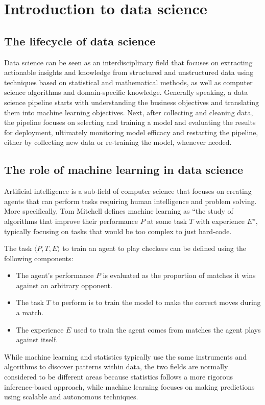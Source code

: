 \documentclass{report}
\begin{document}
\tableofcontents

\chapter{Introduction to data science}
\section{The lifecycle of data science}
Data science can be seen as an interdisciplinary field that focuses on extracting actionable insights and knowledge from structured and unstructured data using techniques based on statistical and mathematical methods, as well as computer science algorithms and domain-specific knowledge. \newline
Generally speaking, a data science pipeline starts with understanding the business objectives and translating them into machine learning objectives. \newline
Next, after collecting and cleaning data, the pipeline focuses on selecting and training a model and evaluating the results for deployment, ultimately monitoring model efficacy and restarting the pipeline, either by collecting new data or re-training the model, whenever needed.
\section{The role of machine learning in data science}
Artificial intelligence is a sub-field of computer science that focuses on creating agents that can perform tasks requiring human intelligence and problem solving. \newline
More specifically, Tom Mitchell defines machine learning as ``the study of algorithms that improve their performance $\displaystyle P$ at some task $\displaystyle T$ with experience $\displaystyle E$'', typically focusing on tasks that would be too complex to just hard-code.
\begin{examplebox}
    The task $\displaystyle \langle P, T, E \rangle$ to train an agent to play checkers can be defined using the following components:
    \begin{itemize}
        \item The agent's performance $\displaystyle P$ is evaluated as the proportion of matches it wins against an arbitrary opponent.
        \item The task $\displaystyle T$ to perform is to train the model to make the correct moves during a match.
        \item The experience $\displaystyle E$ used to train the agent comes from matches the agent plays against itself.
    \end{itemize}
\end{examplebox}
\noindent While machine learning and statistics typically use the same instruments and algorithms to discover patterns within data, the two fields are normally considered to be different areas because statistics follows a more rigorous inference-based approach, while machine learning focuses on making predictions using scalable and autonomous techniques.
\end{document}
